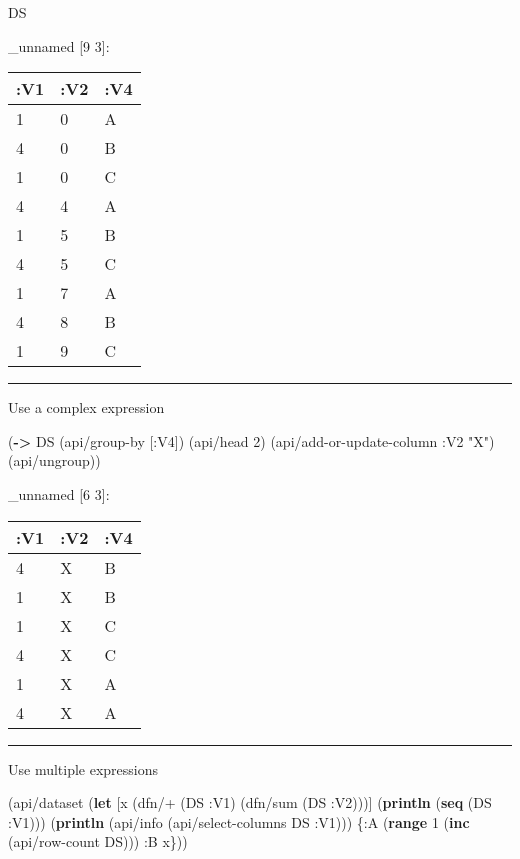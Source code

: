 \documentclass[]{article}
\newenvironment{Shaded}{\begin{snugshade}}{\end{snugshade}}
\newcommand{\KeywordTok}[1]{\textcolor[rgb]{0.13,0.29,0.53}{\textbf{#1}}}
\newcommand{\DecValTok}[1]{\textcolor[rgb]{0.00,0.00,0.81}{#1}}
\newcommand{\StringTok}[1]{\textcolor[rgb]{0.31,0.60,0.02}{#1}}
\newcommand{\AttributeTok}[1]{\textcolor[rgb]{0.77,0.63,0.00}{#1}}
\newcommand{\NormalTok}[1]{#1}
\begin{document}
\begin{Shaded}
\begin{Highlighting}[]
\NormalTok{DS}
\end{Highlighting}
\end{Shaded}

\_unnamed {[}9 3{]}:

\begin{longtable}[]{@{}lll@{}}
\toprule
:V1 & :V2 & :V4\tabularnewline
\midrule
\endhead
1 & 0 & A\tabularnewline
4 & 0 & B\tabularnewline
1 & 0 & C\tabularnewline
4 & 4 & A\tabularnewline
1 & 5 & B\tabularnewline
4 & 5 & C\tabularnewline
1 & 7 & A\tabularnewline
4 & 8 & B\tabularnewline
1 & 9 & C\tabularnewline
\bottomrule
\end{longtable}

\begin{center}\rule{0.5\linewidth}{0.5pt}\end{center}

Use a complex expression

\begin{Shaded}
\begin{Highlighting}[]
\NormalTok{(}\KeywordTok{->}\NormalTok{ DS}
\NormalTok{    (api/group-by [}\AttributeTok{:V4}\NormalTok{])}
\NormalTok{    (api/head }\DecValTok{2}\NormalTok{)}
\NormalTok{    (api/add-or-update-column }\AttributeTok{:V2} \StringTok{"X"}\NormalTok{)}
\NormalTok{    (api/ungroup))}
\end{Highlighting}
\end{Shaded}

\_unnamed {[}6 3{]}:

\begin{longtable}[]{@{}lll@{}}
\toprule
:V1 & :V2 & :V4\tabularnewline
\midrule
\endhead
4 & X & B\tabularnewline
1 & X & B\tabularnewline
1 & X & C\tabularnewline
4 & X & C\tabularnewline
1 & X & A\tabularnewline
4 & X & A\tabularnewline
\bottomrule
\end{longtable}

\begin{center}\rule{0.5\linewidth}{0.5pt}\end{center}

Use multiple expressions

\begin{Shaded}
\begin{Highlighting}[]
\NormalTok{(api/dataset (}\KeywordTok{let}\NormalTok{ [x (dfn/+ (DS }\AttributeTok{:V1}\NormalTok{) (dfn/sum (DS }\AttributeTok{:V2}\NormalTok{)))]}
\NormalTok{               (}\KeywordTok{println}\NormalTok{ (}\KeywordTok{seq}\NormalTok{ (DS }\AttributeTok{:V1}\NormalTok{)))}
\NormalTok{               (}\KeywordTok{println}\NormalTok{ (api/info (api/select-columns DS }\AttributeTok{:V1}\NormalTok{)))}
\NormalTok{               \{}\AttributeTok{:A}\NormalTok{ (}\KeywordTok{range} \DecValTok{1}\NormalTok{ (}\KeywordTok{inc}\NormalTok{ (api/row-count DS)))}
                \AttributeTok{:B}\NormalTok{ x\}))}
\end{Highlighting}
\end{Shaded}
\end{document}
